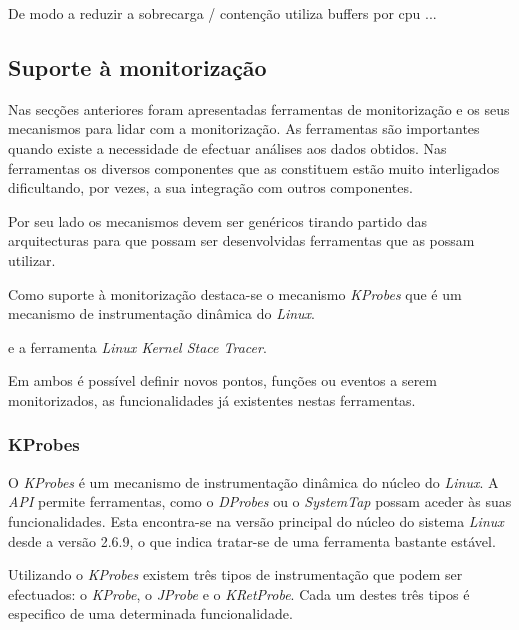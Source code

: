 De modo a reduzir a sobrecarga / contenção utiliza buffers por cpu ... 



\subsection{Suporte à monitorização}

Nas secções anteriores foram apresentadas ferramentas de monitorização e os seus mecanismos para lidar com a monitorização.
As ferramentas são importantes quando existe a necessidade de efectuar análises aos dados obtidos.
Nas ferramentas os diversos componentes que as constituem estão muito interligados dificultando, por vezes, a sua integração com outros componentes.

Por seu lado os mecanismos devem ser genéricos tirando partido das arquitecturas para que possam ser desenvolvidas ferramentas que as possam utilizar.


Como suporte à monitorização destaca-se o mecanismo \textit{KProbes} que é um mecanismo de instrumentação dinâmica do \textit{Linux}.


e a ferramenta \textit{Linux Kernel Stace Tracer}.

Em \todo{} ambos é possível definir novos pontos, funções ou eventos a serem monitorizados, as funcionalidades já existentes nestas ferramentas.

\subsubsection{KProbes}\label{sect:KProbes_overview}

O \textit{KProbes} é um mecanismo de instrumentação dinâmica do núcleo do \textit{Linux}.
A \textit{API} permite ferramentas, como o \textit{DProbes} ou o \textit{SystemTap} possam aceder às suas funcionalidades.
Esta encontra-se na versão principal do núcleo do sistema \textit{Linux} desde a versão 2.6.9, o que indica tratar-se de uma ferramenta bastante estável\cite{kernel_debug_printk_on_fly,KProbesSite}.

Utilizando o \textit{KProbes} existem três tipos de instrumentação que podem ser efectuados: o \textit{KProbe}, o \textit{JProbe} e o \textit{KRetProbe}.
Cada um destes três tipos é especifico de uma determinada funcionalidade.

